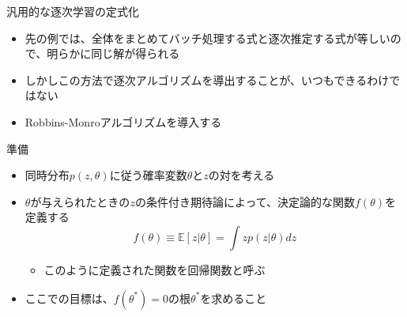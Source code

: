 \begin{frame}{汎用的な逐次学習の定式化}
 \begin{itemize}
  \item 先の例では、全体をまとめてバッチ処理する式と逐次推定する式が等しいので、明らかに同じ解が得られる
  \item しかしこの方法で逐次アルゴリズムを導出することが、いつもできるわけではない
  \item \alert{Robbins-Monroアルゴリズム}を導入する
 \end{itemize}
\end{frame}


\begin{frame}{準備}
 \begin{itemize}
  \item 同時分布$p(z,\theta)$に従う確率変数$\theta$と$z$の対を考える
  \item $\theta$が与えられたときの$z$の条件付き期待論によって、決定論的な関数$f(\theta)$を定義する
        \begin{equation}
         f(\theta) \equiv \mathbb{E}[z|\theta] = \int zp(z|\theta)dz
        \end{equation}
        \begin{itemize}
         \item このように定義された関数を回帰関数と呼ぶ
        \end{itemize}
  \item ここでの目標は、$f(\theta^\ast)=0$の根$\theta^\ast$を求めること
 \end{itemize}
\end{frame}


